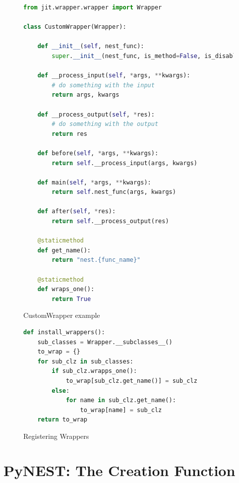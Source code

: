 \begin{figure}[ht!]
\centering
 \begin{lstlisting}[language=Python]
from jit.wrapper.wrapper import Wrapper

class CustomWrapper(Wrapper):

    def __init__(self, nest_func):
        super.__init__(nest_func, is_method=False, is_disabled=False)
        
    def __process_input(self, *args, **kwargs):
        # do something with the input
        return args, kwargs

    def __process_output(self, *res):
        # do something with the output
        return res
        
    def before(self, *args, **kwargs):
        return self.__process_input(args, kwargs)
    
    def main(self, *args, **kwargs):
        return self.nest_func(args, kwargs)
        
    def after(self, *res):
        return self.__process_output(res)
        
    @staticmethod
    def get_name():
        return "nest.{func_name}"
    
    @staticmethod
    def wraps_one():
        return True

\end{lstlisting}
    \caption{CustomWrapper example}
    \label{fig:custom_wrapper}
\end{figure}




\begin{figure}[ht!]
    \centering
    \begin{lstlisting}[language=Python]
def install_wrappers():
    sub_classes = Wrapper.__subclasses__()
    to_wrap = {}
    for sub_clz in sub_classes:
        if sub_clz.wrapps_one():
            to_wrap[sub_clz.get_name()] = sub_clz
        else:
            for name in sub_clz.get_name():
                to_wrap[name] = sub_clz
    return to_wrap
\end{lstlisting}
    \caption{Registering Wrappers}
    \label{fig:wrapper_reg}
\end{figure}





\section{PyNEST: The Creation Function}

